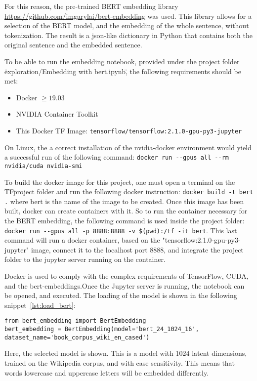 For this reason, the pre-trained BERT embedding library \url{https://github.com/imgarylai/bert-embedding} was used. This library allows for a selection of the BERT model, and the embedding of the whole sentence, without tokenization. The result is a json-like dictionary in Python that contains both the original sentence and the embedded sentence.

To be able to run the embedding notebook, provided under the project folder \"exploration/Embedding with bert.ipynb\", the following requirements should be met:
\begin{itemize}
  \item Docker $\geq19.03$
  \item NVIDIA Container Toolkit
  \item This Docker TF Image: \lstinline{tensorflow/tensorflow:2.1.0-gpu-py3-jupyter}
\end{itemize}

On Linux, the a correct installation of the nvidia-docker environment would yield a successful run of the following command: \lstinline{docker run --gpus all --rm nvidia/cuda nvidia-smi}

To build the docker image for this project, one must open a terminal on the \"TF\" project folder and run the following docker instruction: \lstinline{docker build -t bert .} where bert is the name of the image to be created.
Once this image has been built, docker can create containers with it. So to run the container necessary for the BERT embedding, the following command is used inside the project folder: \lstinline{docker run --gpus all -p 8888:8888 -v $(pwd):/tf -it bert}.
This last command will run a docker container, based on the "tensorflow:2.1.0-gpu-py3-jupyter" image, connect it to the localhost port 8888, and integrate the project folder to the jupyter server running on the container.

Docker is used to comply with the complex requirements of TensorFlow, CUDA, and the bert-embeddings.Once the Jupyter server is running, the notebook can be opened, and executed. The loading of the model is shown in the following snippet~\ref{lst:load_bert}:

\begin{lstlisting}[caption={Loading BERT},label=lst:load_bert,frame=single]
from bert_embedding import BertEmbedding
bert_embedding = BertEmbedding(model='bert_24_1024_16', dataset_name='book_corpus_wiki_en_cased')
\end{lstlisting}

Here, the selected model is shown. This is a model with 1024 latent dimensions, trained on the Wikipedia corpus, and with case sensitivity. This means that words lowercase and uppercase letters will be embedded differently.

